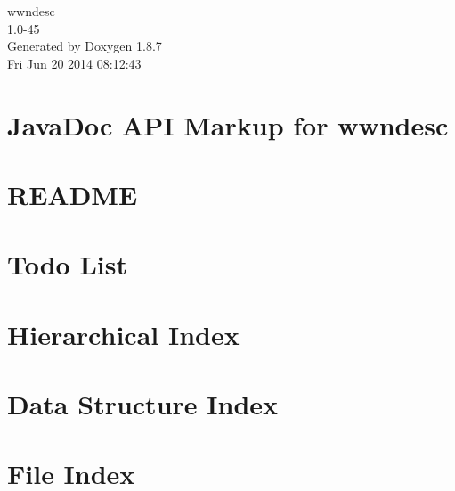 \documentclass[twoside]{book}
\newcommand{\+}{\discretionary{\mbox{\scriptsize$\hookleftarrow$}}{}{}}
\newcommand{\clearemptydoublepage}{%
  \newpage{\pagestyle{empty}\cleardoublepage}%
}
\begin{document}
\begin{titlepage}
\vspace*{7cm}
\begin{center}%
{\Large wwndesc \\[1ex]\large 1.\+0-\/45 }\\
\vspace*{1cm}
{\large Generated by Doxygen 1.8.7}\\
\vspace*{0.5cm}
{\small Fri Jun 20 2014 08:12:43}\\
\end{center}
\end{titlepage}
\clearemptydoublepage
\tableofcontents
\clearemptydoublepage
{}

\chapter{Java\+Doc A\+P\+I Markup for wwndesc}
\label{index}
\chapter{R\+E\+A\+D\+M\+E}
\label{md_htdocs_README}

\chapter{Todo List}
\label{todo}

\chapter{Hierarchical Index}

\chapter{Data Structure Index}

\chapter{File Index}

\end{document}
